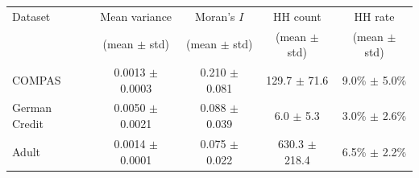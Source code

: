 \begin{tabular}{lcccc}
\hline
Dataset & Mean variance & Moran's $I$ & HH count & HH rate \\
 & (mean $\pm$ std) & (mean $\pm$ std) & (mean $\pm$ std) & (mean $\pm$ std) \\
\hline
COMPAS & 0.0013 $\pm$ 0.0003 & 0.210 $\pm$ 0.081 & 129.7 $\pm$ 71.6 & 9.0\% $\pm$ 5.0\% \\
German Credit & 0.0050 $\pm$ 0.0021 & 0.088 $\pm$ 0.039 & 6.0 $\pm$ 5.3 & 3.0\% $\pm$ 2.6\% \\
Adult & 0.0014 $\pm$ 0.0001 & 0.075 $\pm$ 0.022 & 630.3 $\pm$ 218.4 & 6.5\% $\pm$ 2.2\% \\
\hline
\end{tabular}